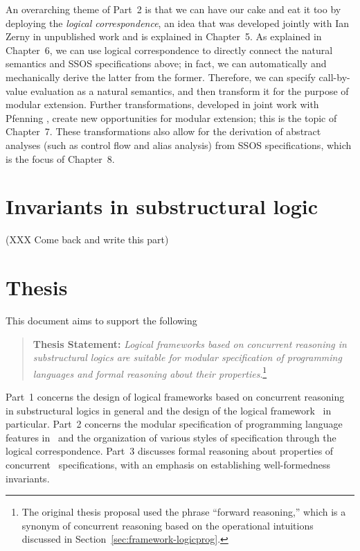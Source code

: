 An overarching theme of Part~2 is that we can have our cake and eat it
too by deploying the {\it logical correspondence}, an idea that was
developed jointly with Ian Zerny in unpublished work and is explained
in Chapter~5. As explained in Chapter~6, we can use logical
correspondence to directly connect the natural semantics and SSOS
specifications above; in fact, we can automatically and mechanically
derive the latter from the former. Therefore, we can specify
call-by-value evaluation as a natural semantics, and then transform it
for the purpose of modular extension. Further transformations,
developed in joint work with Pfenning \cite{simmons11logical}, create
new opportunities for modular extension; this is the topic of
Chapter~7. These transformations also allow for the derivation of
abstract analyses (such as control flow and alias analysis) from SSOS
specifications, which is the focus of Chapter~8.

\section{Invariants in substructural logic}

(XXX Come back and write this part)

\section{Thesis}

This document aims to support the following

\begin{quote} {\bf Thesis Statement:} {\it Logical frameworks based on
    concurrent reasoning in substructural logics are suitable for
    modular specification of programming languages and formal
    reasoning about their properties}.\footnote{The original thesis
    proposal used the phrase ``forward reasoning,'' which is a synonym
    of concurrent reasoning based on the operational intuitions
    discussed in Section~\ref{sec:framework-logicprog}.}
\end{quote}

\noindent
Part~1 concerns the design of logical frameworks based on concurrent
reasoning in substructural logics in general and the design of the
logical framework \sls~in particular. Part~2 concerns the modular
specification of programming language features in \sls~and the
organization of various styles of specification through the logical
correspondence. Part~3 discusses formal reasoning about properties of
concurrent \sls~specifications, with an emphasis on establishing
well-formedness invariants.
